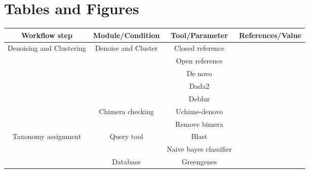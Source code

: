 
\newpage
\section*{Tables and Figures}


  \begin{table}[h]
    \centering
    \small
    \begin{tabular}{|c|c|c|c|}
      \hline
      \textbf{Workflow step} & \textbf{Module/Condition} & \textbf{Tool/Parameter} & \textbf{References/Value} \\
      \hline
      \multirow{7}{*}{Denoising and Clustering} & \multirow{5}{*}{Denoise and Cluster} & Closed reference & \cite{rognesVSEARCHVersatileOpen2016,bolyenReproducibleInteractiveScalable2019} \\
                                                &  & Open reference & \cite{rognesVSEARCHVersatileOpen2016,bolyenReproducibleInteractiveScalable2019} \\
                                                &  & De novo & \cite{rognesVSEARCHVersatileOpen2016,bolyenReproducibleInteractiveScalable2019} \\
                                                &  & Dada2 & \cite{Callahan2016} \\
                                                &  & Deblur & \cite{Amir2017,bolyenReproducibleInteractiveScalable2019} \\
                                                \cline{2-4}
                                                & \multirow{2}{*}{Chimera checking} & Uchime-denovo & \cite{rognesVSEARCHVersatileOpen2016,bolyenReproducibleInteractiveScalable2019} \\
                                                & & Remove bimera & \cite{Callahan2016} \\
                                                \hline
      \multirow{5}{*}{Taxonomy assignment} &  \multirow{2}{*}{Query tool} & Blast & \cite{camachoBLASTArchitectureApplications2009,bokulichOptimizingTaxonomicClassification2018} \\
                                           &  & Naive bayes classifier & \cite{bokulichOptimizingTaxonomicClassification2018} \\
                                           \cline{2-4}
                                           & \multirow{3}{*}{Database} & Greengenes & \cite{DeSantis2006} \\

\end{tabular}
\end{table}
